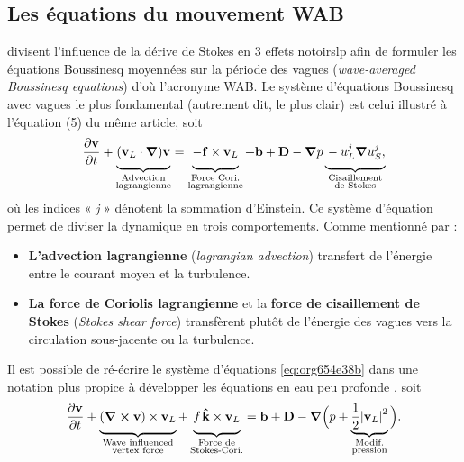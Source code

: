 \documentclass[10pt]{report}
\numberwithin{equation}{section}
\newcommand{\kvf}{\vb{\hat{k}}}
\newcommand{\vv}{\vb{v}}
\newcommand{\grande}{\vphantom{\frac{1}{xx}}}
\newcommand{\pt}{\hspace{1pt}} %
\begin{document}
\subsection{Les équations du mouvement WAB}
\label{sec:orgfb58f95}

\textcite{suzuki2016understanding} divisent l'influence de la dérive de Stokes en 3 effets notoirslp afin de formuler les équations Boussinesq moyennées sur la période des vagues (\emph{wave-averaged Boussinesq equations}) d'où l'acronyme WAB.
Le système d'équations Boussinesq avec vagues le plus fondamental (autrement dit, le plus clair) est celui illustré à l'équation (5) du même article, soit
\begin{equation}
\label{eq:org654e38b}
   \pdv{\vv}{t}
   +\underbrace{\qty( \vv_L\cdot\gradient{})\vv\grande}_{\substack{\text{Advection}\\\text{lagrangienne}}}
   = \underbrace{-\grande\vb{f}\times\vv_L}_{\substack{\text{Force Cori.}\\\text{lagrangienne}}}
   +\vb{b} + \vb{D} - \gradient p
   \underbrace{\grande- u_L^j\gradient{u_S^j},}_{\substack{\text{Cisaillement}\\\text{de Stokes}}}
\end{equation}
où les indices « \emph{j} » dénotent la sommation d'Einstein.
Ce système d'équation permet de diviser la dynamique en trois comportements. 
Comme mentionné par  :

\begin{itemize}
\item \textbf{L'advection lagrangienne} (\emph{lagrangian advection}) transfert de l'énergie entre le courant moyen et la turbulence.
\item \textbf{La force de Coriolis lagrangienne} et la \textbf{force de cisaillement de Stokes} (\emph{Stokes shear force}) transfèrent plutôt de l'énergie des vagues vers la circulation sous-jacente ou la turbulence.
\end{itemize}

Il est possible de ré-écrire le système d'équations \ref{eq:org654e38b} dans une notation plus propice à développer les équations en eau peu profonde \autocite[Voir][équation 1]{suzuki2016understanding}, soit
\begin{equation}
   \pdv{\vv}{t}
   +\underbrace{\grande\qty(\curl{\vv}) \times \vv_L}_{\substack{\text{Wave influenced}\\ \text{vertex force}}}
   +\underbrace{\grande f\pt\kvf\times \vv_L}_{\substack{\text{Force de}\\\text{Stokes-Cori.}}}
   = \vb{b} + \vb{D} -\gradient{}\Big( p + \underbrace{\frac{1}{2}\abs{\vv_L}^2}_{\substack{\text{Modif.}\\\text{pression}}}\Big).
\end{equation}
\end{document}
